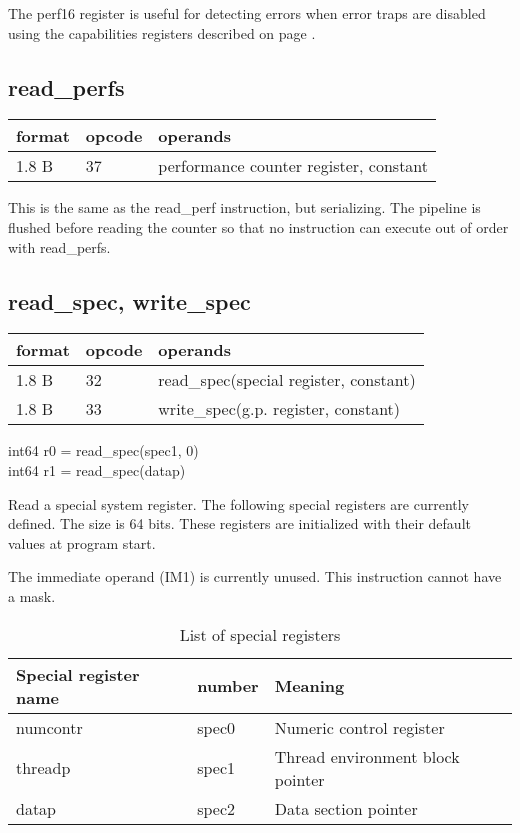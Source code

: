 \documentclass[forwardcom.tex]{subfiles}
\begin{document}
The perf16 register is useful for detecting errors when error traps are disabled using the capabilities registers described on page \pageref{table:capabilitiesRegisters}.
\vv


\subsection{read\_perfs}
\label{table:readPerfSInstruction}
\begin{tabular}{|p{12mm}|p{15mm}|p{100mm}|}
\hline
\bfseries format & \bfseries opcode & \bfseries operands \\ \hline
1.8 B & 37 & performance counter register, constant \\ \hline
\end{tabular}
\vv

This is the same as the read\_perf instruction, but serializing. The pipeline is flushed before reading the counter so that no instruction can execute out of order with read\_perfs.
\vv


\subsection{read\_spec, write\_spec}
\label{table:readSpecInstruction}
\begin{tabular}{|p{12mm}|p{15mm}|p{100mm}|}
\hline
\bfseries format & \bfseries opcode & \bfseries operands \\ \hline
1.8 B & 32 & read\_spec(special register, constant)\\ \hline
1.8 B & 33 & write\_spec(g.p. register, constant) \\ \hline
\end{tabular}
\vv

int64 r0 = read\_spec(spec1, 0) \\
int64 r1 = read\_spec(datap) \\
\vv

Read a special system register. The following special registers are currently defined. The size is 64 bits. These registers are initialized with their default values at program start.
\vv

The immediate operand (IM1) is currently unused. This instruction cannot have a mask.
\vv

\begin{longtable} {|p{25mm}|p{15mm}|p{80mm}|}
\caption{List of special registers} 
\label{table:specialRegisters} \\
\endfirsthead
\endhead
\hline
\bfseries Special register name & \bfseries number & \bfseries Meaning  \\
\hline
numcontr & spec0  & Numeric control register \\
threadp  & spec1  & Thread environment block pointer \\
datap    & spec2  & Data section pointer \\
\hline
\end{longtable}
\end{document}
